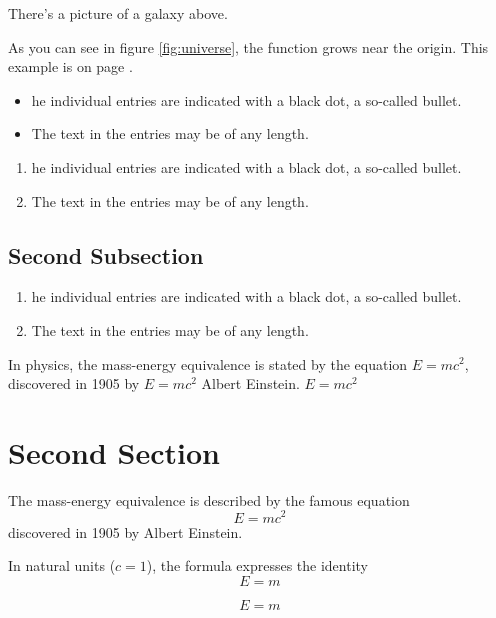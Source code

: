 \documentclass[12pt]{book}
\begin{document}
There's a picture of a galaxy above.

As you can see in figure \ref{fig:universe}, the function grows near the origin. This example is on page \pageref{fig:universe}.

\begin{itemize}
    \item he individual entries are indicated with a black dot, a so-called bullet.
    \item The text in the entries may be of any length.
\end{itemize}

\begin{enumerate}
    \item he individual entries are indicated with a black dot, a so-called bullet.
    \item The text in the entries may be of any length.
\end{enumerate}

\subsection{Second Subsection}

\begin{enumerate}
    \item he individual entries are indicated with a black dot, a so-called bullet.
    \item The text in the entries may be of any length.
\end{enumerate}

In physics, the mass-energy equivalence is stated by the equation $E=mc^2$, discovered in 1905 by \(E=mc^2\) Albert Einstein.
\begin{math}
    E=mc^2
\end{math}

\section{Second Section}

The mass-energy equivalence is described by the famous equation
\[ E=mc^2 \] discovered in 1905 by Albert Einstein. 

In natural units ($c = 1$), the formula expresses the identity
\begin{equation}
    E=m
\end{equation}

\begin{equation}
    E=m
\end{equation}
\end{document}
